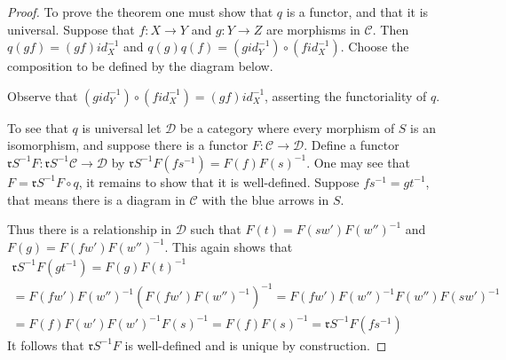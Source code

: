     \begin{proof}
        To prove the theorem one must show that $q$ is a functor, and that it is universal. Suppose that $f: X\rightarrow Y$ and $g: Y\rightarrow Z$ are morphisms in $\mathcal{C}$. Then $q(gf)=(gf)id_X^{-1}$ and $q(g)q(f)=(gid_Y^{-1})\circ(fid_X^{-1})$. Choose the composition to be defined by the diagram below.
        \begin{center}
        \end{center}
        Observe that $(gid_Y^{-1})\circ(fid_X^{-1})=(gf)id_X^{-1}$, asserting the functoriality of $q$.

        To see that $q$ is universal let $\mathcal{D}$ be a category where every morphism of $S$ is an isomorphism, and suppose there is a functor $F:\mathcal{C}\rightarrow\mathcal{D}$. Define a functor $\mathfrak{r}S^{-1}F : \mathfrak{r}S^{-1}\mathcal{C}\rightarrow\mathcal{D}$ by $\mathfrak{r}S^{-1}F(fs^{-1})=F(f)F(s)^{-1}$. One may see that $F = \mathfrak{r}S^{-1}F\circ q$, it remains to show that it is well-defined. Suppose $fs^{-1}=gt^{-1}$, that means there is a diagram in $\mathcal{C}$ with the blue arrows in $S$.
        \begin{center}
        \end{center}
        Thus there is a relationship in $\mathcal{D}$ such that $F(t)=F(sw')F(w'')^{-1}$ and $F(g)=F(fw')F(w'')^{-1}$. This again shows that 
        \begin{multline*}
            \mathfrak{r}S^{-1}F(gt^{-1})=F(g)F(t)^{-1}\\
            =F(fw')F(w'')^{-1}(F(fw')F(w'')^{-1})^{-1}=F(fw')F(w'')^{-1}F(w'')F(sw')^{-1}\\
            =F(f)F(w')F(w')^{-1}F(s)^{-1}=F(f)F(s)^{-1}=\mathfrak{r}S^{-1}F(fs^{-1})
        \end{multline*}
        It follows that $\mathfrak{r}S^{-1}F$ is well-defined and is unique by construction.
    \end{proof}

